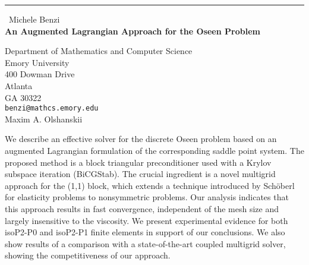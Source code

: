 \documentclass{report}
\begin{document}
\begin{center}
\rule{6in}{1pt} \
{\large Michele Benzi \\
{\bf An Augmented Lagrangian Approach for the Oseen Problem}}

Department of Mathematics and Computer Science \\ Emory University \\ 400 Dowman Drive \\ Atlanta \\ GA 30322
\\
{\tt benzi@mathcs.emory.edu}\\
Maxim A. Olshanskii\end{center}

We describe an effective solver for the discrete Oseen problem
based on an augmented Lagrangian formulation of the corresponding
saddle point system. The proposed method is a block triangular
preconditioner used with a Krylov subspace iteration (BiCGStab).
The crucial ingredient is a novel multigrid approach for the (1,1)
block, which extends a technique introduced by Sch\"oberl for
elasticity problems to nonsymmetric problems. Our analysis indicates
that this approach results in fast convergence, independent of
the mesh size and largely insensitive to the viscosity.
We present experimental evidence for both isoP2-P0 and isoP2-P1
finite elements in support of our conclusions. We also show
results of a comparison with a state-of-the-art coupled multigrid
solver, showing the competitiveness of our approach.
\end{document}
